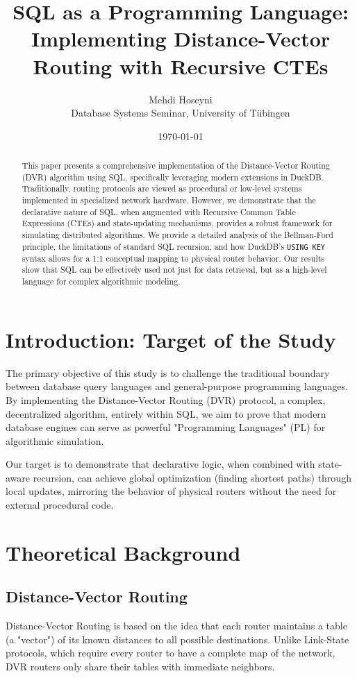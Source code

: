 \documentclass[twocolumn,a4paper,10pt]{article}
\title{\textbf{SQL as a Programming Language: Implementing Distance-Vector Routing with Recursive CTEs}}
\author{Mehdi Hoseyni \\ \small{Database Systems Seminar, University of Tübingen}}
\date{\today}
\begin{document}
\maketitle

\begin{abstract}
This paper presents a comprehensive implementation of the Distance-Vector Routing (DVR) algorithm using SQL, specifically leveraging modern extensions in DuckDB. Traditionally, routing protocols are viewed as procedural or low-level systems implemented in specialized network hardware. However, we demonstrate that the declarative nature of SQL, when augmented with Recursive Common Table Expressions (CTEs) and state-updating mechanisms, provides a robust framework for simulating distributed algorithms. We provide a detailed analysis of the Bellman-Ford principle, the limitations of standard SQL recursion, and how DuckDB's \texttt{USING KEY} syntax allows for a 1:1 conceptual mapping to physical router behavior. Our results show that SQL can be effectively used not just for data retrieval, but as a high-level language for complex algorithmic modeling.
\end{abstract}

\section{Introduction: Target of the Study}
The primary objective of this study is to challenge the traditional boundary between database query languages and general-purpose programming languages. By implementing the Distance-Vector Routing (DVR) protocol, a complex, decentralized algorithm, entirely within SQL, we aim to prove that modern database engines can serve as powerful "Programming Languages" (PL) for algorithmic simulation. 

Our target is to demonstrate that declarative logic, when combined with state-aware recursion, can achieve global optimization (finding shortest paths) through local updates, mirroring the behavior of physical routers without the need for external procedural code.

\section{Theoretical Background}
\subsection{Distance-Vector Routing}
Distance-Vector Routing is based on the idea that each router maintains a table (a "vector") of its known distances to all possible destinations. Unlike Link-State protocols, which require every router to have a complete map of the network, DVR routers only share their tables with immediate neighbors.
\end{document}
